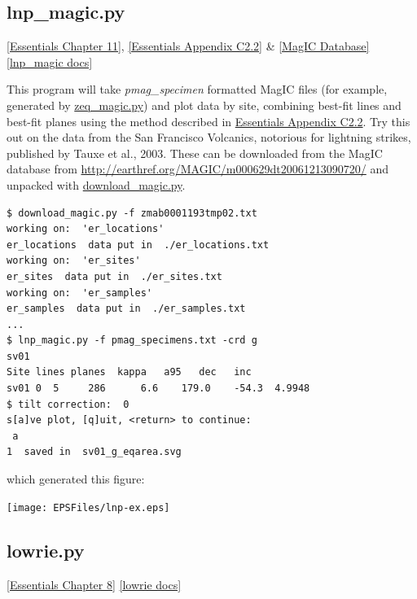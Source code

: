 \documentclass[11pt]{book}
\begin{document}
{{{{%
\subsection{lnp\_magic.py}
\href{http://earthref.org/MAGIC/books/Tauxe/Essentials/WebBook3ch11.html#ch11}{ [Essentials Chapter 11]},  \href{http://earthref.org/MAGIC/books/Tauxe/Essentials/WebBook3ap3.html#linesNplanes}{[Essentials Appendix C2.2]} \& \href{#MagICDatabase}{[MagIC Database]}
\href{https://github.com/PmagPy/PmagPy/blob/master/programs/lnp_magic.py}{[lnp\_magic docs]}

This program will take {\it pmag\_specimen} formatted MagIC files (for example, generated by \href{#zeq_magic.py}{zeq\_magic.py}) and plot data by site, combining best-fit lines and best-fit planes using the method described in  \href{http://earthref.org/MAGIC/books/Tauxe/Essentials/WebBook3ap3.html#linesNplanes}{Essentials Appendix C2.2}.  Try this out on the data from the San Francisco Volcanics, notorious for lightning strikes, published by Tauxe et al., 2003. \nocite{tauxe03b}  These can be downloaded from the MagIC database from \url{http://earthref.org/MAGIC/m000629dt20061213090720/} and unpacked with
\href{#download_magic.py}{download\_magic.py}.


\begin{verbatim}
$ download_magic.py -f zmab0001193tmp02.txt
working on:  'er_locations'
er_locations  data put in  ./er_locations.txt
working on:  'er_sites'
er_sites  data put in  ./er_sites.txt
working on:  'er_samples'
er_samples  data put in  ./er_samples.txt
...
$ lnp_magic.py -f pmag_specimens.txt -crd g
sv01
Site lines planes  kappa   a95   dec   inc
sv01 0  5     286      6.6    179.0    -54.3  4.9948
$ tilt correction:  0
s[a]ve plot, [q]uit, <return> to continue:
 a
1  saved in  sv01_g_eqarea.svg

\end{verbatim}

\noindent which generated this figure:

\texttt{[image: EPSFiles/lnp-ex.eps]}

\subsection{lowrie.py}
\href{http://earthref.org/MAGIC/books/Tauxe/Essentials/WebBook3ch8.html#lowrie}{[Essentials Chapter 8]}
\href{https://github.com/PmagPy/PmagPy/blob/master/programs/lowrie.py}{[lowrie docs]}

}}}}
\end{document}
